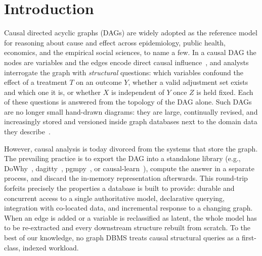 \section{Introduction}\label{sec:intro}

Causal directed acyclic graphs (DAGs) are widely adopted as the reference
model for reasoning about cause and effect across epidemiology, public health,
economics, and the empirical social sciences, to name a few. In a causal DAG
the nodes are variables and the edges encode direct causal
influence~\cite{pearl2009causality}, and analysts interrogate the graph with
\textit{structural} questions: which variables confound the effect of a
treatment $T$ on an outcome $Y$, whether a valid adjustment set exists and
which one it is, or whether $X$ is independent of $Y$ once $Z$ is held fixed.
Each of these questions is answered from the topology of the DAG alone. Such
DAGs are no longer small hand-drawn diagrams: they are large, continually
revised, and increasingly stored and versioned inside graph databases next to
the domain data they describe~\cite{pachera2025whatif,qiu2026causal}.

However, causal analysis is today divorced from the systems that store the
graph. The prevailing practice is to export the DAG into a standalone library
(e.g., DoWhy~\cite{sharma2020dowhy}, dagitty~\cite{textor2016dagitty},
pgmpy~\cite{ankan2024pgmpy}, or causal-learn~\cite{zheng2024causallearn}),
compute the answer in a separate process, and discard the in-memory
representation afterwards. This round-trip forfeits precisely the properties a
database is built to provide: durable and concurrent access to a single
authoritative model, declarative querying, integration with co-located data,
and incremental response to a changing graph. When an edge is added or a
variable is reclassified as latent, the whole model has to be re-extracted and
every downstream structure rebuilt from scratch. To the best of our knowledge,
no graph DBMS treats causal structural queries as a first-class, indexed
workload.

